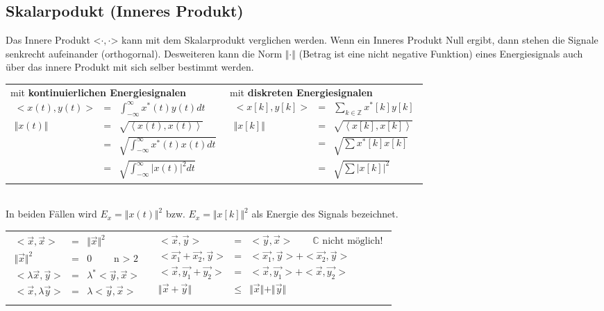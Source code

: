 \subsection{Skalarpodukt (Inneres Produkt)}
Das Innere Produkt <$ \cdot , \cdot $> kann mit dem Skalarprodukt verglichen werden. Wenn ein Inneres Produkt Null ergibt, dann stehen die Signale senkrecht aufeinander (orthogornal). Desweiteren kann die Norm $\Vert \cdot \Vert$ (Betrag ist eine nicht negative Funktion) eines Energiesignals auch über das innere Produkt mit sich selber bestimmt werden.\\
\vspace{6pt}
\begin{tabular}{ll}
 \parbox{6cm}{
\centering 
 mit \textbf{kontinuierlichen Energiesignalen}
\begin{eqnarray*}
< x(t), y(t)> &=& \int_{-\infty}^\infty x^*(t) y(t) dt\\
\Vert x(t) \Vert &=& \sqrt{ \left\langle  x(t), x(t) \right\rangle }\\
&=& \sqrt{\int_{-\infty}^\infty x^*(t) x(t)dt} \\
&=& \sqrt{\int_{-\infty}^\infty  \vert x(t) \vert^2  dt}
\end{eqnarray*}}
&\parbox{6cm}{
\centering 
mit \textbf{diskreten Energiesignalen}
\begin{eqnarray*}
< x[k], y[k]> &=& \sum_{k \in \mathbb{Z}} x^*[k] y[k]\\
\Vert x[k] \Vert &=& \sqrt{ \left\langle  x[k], x[k] \right\rangle }\\
&=& \sqrt{\sum x^*[k] x[k]}\\
&=& \sqrt{\sum \vert x[k] \vert^2 }
\end{eqnarray*}}
\end{tabular}\\
In beiden Fällen wird $E_x = \Vert x(t) \Vert^2$ bzw. $E_x = \Vert x[k] \Vert^2$ als Energie des Signals bezeichnet.\\
\begin{tabular}{ll}
 \parbox{6cm}{
 \begin{eqnarray*}
< \vec{x}, \vec{x}> &=& \Vert \vec{x} \Vert^2 \\
\Vert \vec{x} \Vert^2 &=& 0 \qquad \text{n $>$ 2} \\
< \lambda \vec{x}, \vec{y}> &=& \lambda^* < \vec{y}, \vec{x}>\\
< \vec{x}, \lambda  \vec{y}> 	&=&	\lambda < \vec{y}, \vec{x}>	\\
\end{eqnarray*}}
&\parbox{6cm}{
\begin{eqnarray*}
< \vec{x}, \vec{y}> 				&=&< \vec{y}, \vec{x}>  	\qquad 	\text{$\mathbb{C}$ nicht möglich!} \\
< \vec{x_1}+ \vec{x_2}, \vec{y}> 	&=&< \vec{x_1}, \vec{y}> + < \vec{x_2}, \vec{y}>	\\
< \vec{x} , \vec{y_1}+ \vec{y_2}> 	&=&< \vec{x}, \vec{y_1}> + < \vec{x}, \vec{y_2}>	\\			
\Vert \vec{x} + \vec{y} \Vert 		&\leqslant& \Vert \vec{x} \Vert + \Vert \vec{y} \Vert 
\end{eqnarray*}}
\end{tabular}
